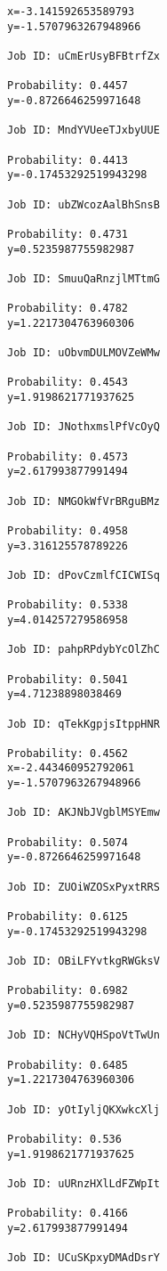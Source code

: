 \documentclass[11pt]{article}
\begin{document}
    \begin{Verbatim}[commandchars=\\\{\}]
x=-3.141592653589793
y=-1.5707963267948966

Job ID: uCmErUsyBFBtrfZx

Probability: 0.4457
y=-0.8726646259971648

Job ID: MndYVUeeTJxbyUUE

Probability: 0.4413
y=-0.17453292519943298

Job ID: ubZWcozAalBhSnsB

Probability: 0.4731
y=0.5235987755982987

Job ID: SmuuQaRnzjlMTtmG

Probability: 0.4782
y=1.2217304763960306

Job ID: uObvmDULMOVZeWMw

Probability: 0.4543
y=1.9198621771937625

Job ID: JNothxmslPfVcOyQ

Probability: 0.4573
y=2.617993877991494

Job ID: NMGOkWfVrBRguBMz

Probability: 0.4958
y=3.316125578789226

Job ID: dPovCzmlfCICWISq

Probability: 0.5338
y=4.014257279586958

Job ID: pahpRPdybYcOlZhC

Probability: 0.5041
y=4.71238898038469

Job ID: qTekKgpjsItppHNR

Probability: 0.4562
x=-2.443460952792061
y=-1.5707963267948966

Job ID: AKJNbJVgblMSYEmw

Probability: 0.5074
y=-0.8726646259971648

Job ID: ZUOiWZOSxPyxtRRS

Probability: 0.6125
y=-0.17453292519943298

Job ID: OBiLFYvtkgRWGksV

Probability: 0.6982
y=0.5235987755982987

Job ID: NCHyVQHSpoVtTwUn

Probability: 0.6485
y=1.2217304763960306

Job ID: yOtIyljQKXwkcXlj

Probability: 0.536
y=1.9198621771937625

Job ID: uURnzHXlLdFZWpIt

Probability: 0.4166
y=2.617993877991494

Job ID: UCuSKpxyDMAdDsrY


\end{Verbatim}
\end{document}
